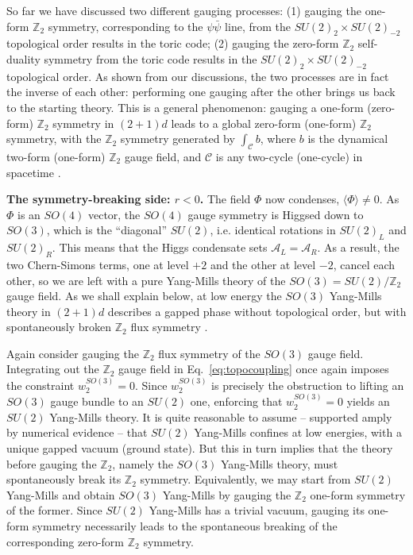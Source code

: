 \documentclass[aps, prl, superscriptaddress, twocolumn,
notitlepage, longbibliography,
floatfix]{revtex4-2}
\newcommand{\1}{\text{\uppercase\expandafter{\romannumeral1}}}
\newcommand{\2}{\text{\uppercase\expandafter{\romannumeral2}}}
\newcommand{\3}{\text{\uppercase\expandafter{\romannumeral3}}}
\newcommand{\4}{\text{\uppercase\expandafter{\romannumeral4}}}
\newcommand{\5}{\text{\uppercase\expandafter{\romannumeral5}}}
\newcommand{\6}{\text{\uppercase\expandafter{\romannumeral6}}}
\def\Z{\mathbb{Z}}
\begin{document}
So far we have discussed two different gauging processes: (1) gauging the one-form $\Z_2$ symmetry, corresponding to the $\psi\bar{\psi}$ line, from the $SU(2)_2\times SU(2)_{-2}$ topological order {results in the toric code}; (2) gauging the zero-form $\Z_2$ self-duality symmetry from the toric code {results in the $SU(2)_2\times SU(2)_{-2}$ topological order}.
As shown from our discussions, the two processes are in fact the inverse of each other: performing one gauging after the other brings us back to the starting theory. This is a general phenomenon: gauging a one-form (zero-form) $\Z_2$ symmetry in $(2+1)d$ leads to a global zero-form (one-form) $\Z_2$ symmetry, with the $\Z_2$ symmetry generated by $\int_\mathcal{C} b$, where $b$ is the dynamical two-form (one-form) $\Z_2$ gauge field, and $\mathcal{C}$ is any two-cycle (one-cycle) in spacetime \cite{HigherFormSym}.

\textbf{\boldmath The symmetry-breaking side: $r<0$.} The field $\Phi$ now condenses, $\langle\Phi\rangle\neq0$. As $\Phi$ is an $SO(4)$ vector, the $SO(4)$ gauge symmetry is Higgsed down to $SO(3)$, which is the ``diagonal'' $SU(2)$, i.e. identical rotations in $SU(2)_L$ and $SU(2)_R$. This means that the Higgs condensate sets $\mathcal{A}_L=\mathcal{A}_R$. As a result, the two Chern-Simons terms, one at level $+2$ and the other at level $-2$, cancel each other, so we are left with a pure Yang-Mills theory of the $SO(3)=SU(2)/\mathbb{Z}_2$ gauge field. As we shall explain below, at low energy the $SO(3)$ Yang-Mills theory in $(2+1)d$ describes a gapped phase without topological order, but with spontaneously broken $\Z_2$ flux symmetry  \cite{KovnerReview,ReadingBetweenLines}.

Again consider gauging the $\mathbb{Z}_2$ flux symmetry of the $SO(3)$ gauge field. Integrating out the $\mathbb{Z}_2$ gauge field in Eq.~\eqref{eq:topocoupling} once again imposes the constraint $w_2^{SO(3)} = 0$. Since $w_2^{SO(3)}$ is precisely the obstruction to lifting an $SO(3)$ gauge bundle to an $SU(2)$ one, enforcing that $w_2^{SO(3)}=0$ yields an $SU(2)$ Yang-Mills theory. It is quite reasonable to assume -- supported amply by numerical evidence \cite{Teper,AthenodorouTeper} -- that $SU(2)$ Yang-Mills confines at low energies, with a unique gapped vacuum (ground state). But this in turn implies that the theory before gauging the $\mathbb{Z}_2$, namely the $SO(3)$ Yang-Mills theory, must spontaneously break its $\mathbb{Z}_2$ symmetry. Equivalently, we may start from $SU(2)$ Yang-Mills and obtain $SO(3)$ Yang-Mills by gauging the $\mathbb{Z}_2$ one-form symmetry of the former. Since $SU(2)$ Yang-Mills has a trivial vacuum, gauging its one-form symmetry necessarily leads to the spontaneous breaking of the corresponding zero-form $\mathbb{Z}_2$ symmetry.
\end{document}
